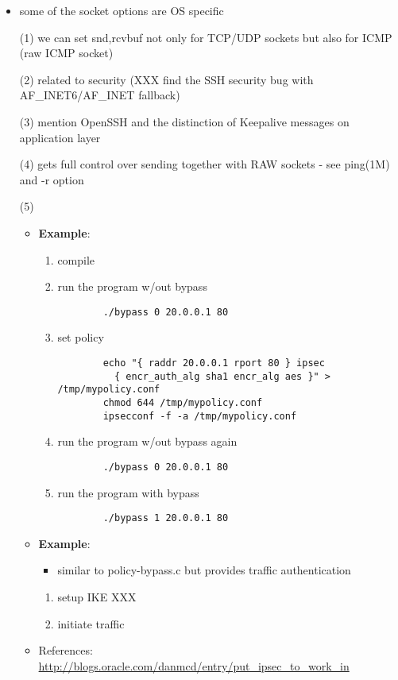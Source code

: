 \begin{itemize}
  \item some of the socket options are OS specific
  \item[(1)] we can set {snd,rcv}buf not only for TCP/UDP sockets but also
	  for ICMP (raw ICMP socket)
  \item[(2)] related to security (XXX find the SSH security bug with
    AF\_INET6/AF\_INET fallback)
  \item[(3)] mention OpenSSH and the distinction of Keepalive messages
	on application layer
  \item[(4)] gets full control over sending together with RAW sockets
	  - see ping(1M) and -r option
  \item[(5)]
  \begin{itemize}
    \item {\bf Example}: 
\begin{enumerate}
		 \item compile
		 \item run the program w/out bypass
\begin{verbatim}
	    ./bypass 0 20.0.0.1 80
\end{verbatim}
		 \item set policy
\begin{verbatim}
	    echo "{ raddr 20.0.0.1 rport 80 } ipsec
	      { encr_auth_alg sha1 encr_alg aes }" > /tmp/mypolicy.conf
	    chmod 644 /tmp/mypolicy.conf
	    ipsecconf -f -a /tmp/mypolicy.conf
\end{verbatim}
	         \item run the program w/out bypass again
\begin{verbatim}
	    ./bypass 0 20.0.0.1 80
\end{verbatim}
		 \item run the program with bypass
\begin{verbatim}
	    ./bypass 1 20.0.0.1 80
\end{verbatim}
\end{enumerate}
  \item {\bf Example}: 
		   \begin{itemize}
		   \item similar to policy-bypass.c but provides traffic 
                   authentication
		   \end{itemize}
		 \begin{enumerate}
		 \item setup IKE
		    XXX
                 \item initiate traffic
		 \end{enumerate}
  \item References:
    \url{http://blogs.oracle.com/danmcd/entry/put\_ipsec\_to\_work\_in}
  \end{itemize}  
\end{itemize}  


